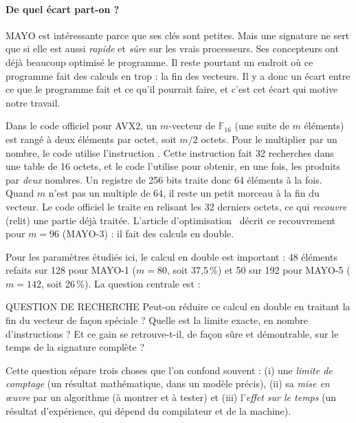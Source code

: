\paragraph{De quel écart part-on ?} MAYO est intéressante parce que ses clés sont petites. Mais une signature ne sert que si elle est aussi \emph{rapide} et \emph{sûre} sur les vrais processeurs. Ses concepteurs ont déjà beaucoup optimisé le programme. Il reste pourtant un endroit où ce programme fait des calculs en trop : la fin des vecteurs. Il y a donc un écart entre ce que le programme fait et ce qu'il pourrait faire, et c'est cet écart qui motive notre travail.

Dans le code officiel pour AVX2, un $m$-vecteur de $\mathbb{F}_{16}$ (une suite de $m$ éléments) est rangé à deux éléments par octet, soit $m/2$ octets. Pour le multiplier par un nombre, le code utilise l'instruction \vpshufb{}. Cette instruction fait 32 recherches dans une table de 16 octets, et le code l'utilise pour obtenir, en une fois, les produits par \emph{deux} nombres. Un registre de 256 bits traite donc 64 éléments à la fois. Quand $m$ n'est pas un multiple de 64, il reste un petit morceau à la fin du vecteur. Le code officiel le traite en relisant les 32 derniers octets, ce qui \emph{recouvre} (relit) une partie déjà traitée. L'article d'optimisation~\cite{nibbling} décrit ce recouvrement pour $m=96$ (MAYO-3) : il fait des calculs en double.

Pour les paramètres étudiés ici, le calcul en double est important : 48 éléments refaits sur 128 pour MAYO-1 ($m=80$, soit 37,5\,\%) et 50 sur 192 pour MAYO-5 ($m=142$, soit 26\,\%). La question centrale est :

\begin{bidentidad}{QUESTION DE RECHERCHE}
\centering Peut-on réduire ce calcul en double en traitant la fin du vecteur de façon spéciale ? Quelle est la limite exacte, en nombre d'instructions \vpshufb{} ? Et ce gain se retrouve-t-il, de façon sûre et démontrable, sur le temps de la signature complète ?
\end{bidentidad}

Cette question sépare trois choses que l'on confond souvent : (i) une \emph{limite de comptage} (un résultat mathématique, dans un modèle précis), (ii) sa \emph{mise en œuvre} par un algorithme (à montrer et à tester) et (iii) l'\emph{effet sur le temps} (un résultat d'expérience, qui dépend du compilateur et de la machine).


